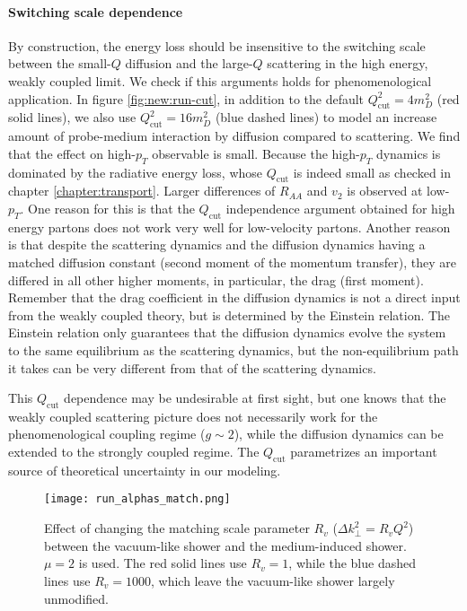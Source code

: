 \paragraph{Switching scale dependence} By construction, the energy loss should be insensitive to the switching scale between the small-$Q$ diffusion and the large-$Q$ scattering in the high energy, weakly coupled limit.
We check if this arguments holds for phenomenological application.
In figure \ref{fig:new:run-cut}, in addition to the default $Q_\textrm{cut}^2 = 4 m_D^2$ (red solid lines), we also use $Q_\textrm{cut}^2 = 16 m_D^2$ (blue dashed lines) to model an increase amount of probe-medium interaction by diffusion compared to scattering.
We find that the effect on high-$p_T$ observable is small.
Because the high-$p_T$ dynamics is dominated by the radiative energy loss, whose $Q_\textrm{cut}$ is indeed small as checked in chapter \ref{chapter:transport}.
Larger differences of $R_{AA}$ and $v_2$ is observed at low-$p_T$.
One reason for this is that the $Q_\textrm{cut}$ independence argument obtained for high energy partons does not work very well for low-velocity partons.
Another reason is that despite the scattering dynamics and the diffusion dynamics having a matched diffusion constant (second moment of the momentum transfer), they are differed in all other higher moments, in particular, the drag (first moment).
Remember that the drag coefficient in the diffusion dynamics is not a direct input from the weakly coupled theory, but is determined by the Einstein relation.
The Einstein relation only guarantees that the diffusion dynamics evolve the system to the same equilibrium as the scattering dynamics, but the non-equilibrium path it takes can be very different from that of the scattering dynamics.

This $Q_\textrm{cut}$ dependence may be undesirable at first sight, but one knows that the weakly coupled scattering picture does not necessarily work for the phenomenological coupling regime ($g\sim 2$), while the diffusion dynamics can be extended to the strongly coupled regime.
The $Q_\textrm{cut}$ parametrizes an important source of theoretical uncertainty in our modeling.

\begin{figure}
\singlespacing
\centering
\texttt{[image: run\_alphas\_match.png]}
\caption[Effect of changing the matching scale parameter $R_v$]{Effect of changing the matching scale parameter $R_v$ ($\Delta k_\perp^2 = R_v Q^2$) between the vacuum-like shower and the medium-induced shower. $\mu=2$ is used. The red solid lines use $R_v =1$, while the blue dashed lines use $R_v = 1000$, which leave the vacuum-like shower largely unmodified.}
\label{fig:new:run-match}
\end{figure}

